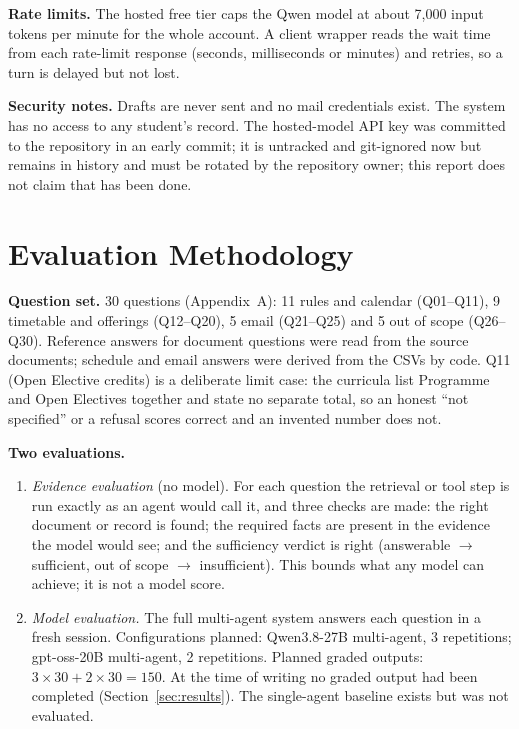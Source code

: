 \documentclass[10pt,a4paper]{article}
\begin{document}
\textbf{Rate limits.} The hosted free tier caps the Qwen model at about 7,000 input tokens per minute for the whole account. A client wrapper reads the wait time from each rate-limit response (seconds, milliseconds or minutes) and retries, so a turn is delayed but not lost.

\textbf{Security notes.} Drafts are never sent and no mail credentials exist. The system has no access to any student's record. The hosted-model API key was committed to the repository in an early commit; it is untracked and git-ignored now but remains in history and must be rotated by the repository owner; this report does not claim that has been done.

\section{Evaluation Methodology}\label{sec:evalmethod}
\textbf{Question set.} 30 questions (Appendix~A): 11 rules and calendar (Q01--Q11), 9 timetable and offerings (Q12--Q20), 5 email (Q21--Q25) and 5 out of scope (Q26--Q30). Reference answers for document questions were read from the source documents; schedule and email answers were derived from the CSVs by code. Q11 (Open Elective credits) is a deliberate limit case: the curricula list Programme and Open Electives together and state no separate total, so an honest ``not specified'' or a refusal scores correct and an invented number does not.

\textbf{Two evaluations.}
\begin{enumerate}
  \item \emph{Evidence evaluation} (no model). For each question the retrieval or tool step is run exactly as an agent would call it, and three checks are made: the right document or record is found; the required facts are present in the evidence the model would see; and the sufficiency verdict is right (answerable $\to$ sufficient, out of scope $\to$ insufficient). This bounds what any model can achieve; it is not a model score.
  \item \emph{Model evaluation.} The full multi-agent system answers each question in a fresh session. Configurations planned: Qwen3.8-27B multi-agent, 3 repetitions; gpt-oss-20B multi-agent, 2 repetitions. Planned graded outputs: $3\times30+2\times30=150$. At the time of writing no graded output had been completed (Section~\ref{sec:results}). The single-agent baseline exists but was not evaluated.
\end{enumerate}
\end{document}

